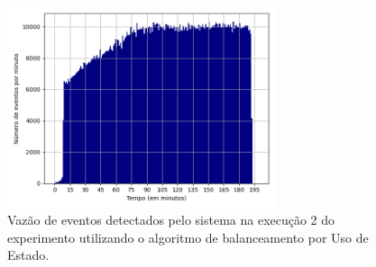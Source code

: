 




\begin{figure}[h]
\centering
\includegraphics[width=0.7\textwidth]{figuras/graphics/histogram_vazao_7-dez-su.png}
\caption{Vazão de eventos detectados pelo sistema na execução 2 do experimento utilizando o algoritmo de balanceamento por Uso de Estado.}
\label{fig:vazao_7-dez-su}
\end{figure}




